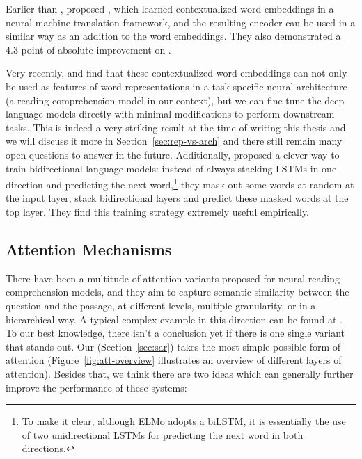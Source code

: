 Earlier than ,  proposed , which learned contextualized word embeddings in a neural machine translation framework, and the resulting encoder can be used in a similar way as an addition to the word embeddings. They also demonstrated a $4.3$ point of absolute improvement on .

Very recently,  and  find that these contextualized word embeddings can not only be used as features of word representations in a task-specific neural architecture (a reading comprehension model in our context), but we can fine-tune the deep language models directly with minimal modifications to perform downstream tasks. This is indeed a very striking result at the time of writing this thesis and we will discuss it more in Section~\ref{sec:rep-vs-arch} and there still remain many open questions to answer in the future. Additionally,  proposed a clever way to train bidirectional language models: instead of always stacking LSTMs in one direction and predicting the next word,\footnote{To make it clear, although ELMo adopts a biLSTM, it is essentially the use of two unidirectional LSTMs for predicting the next word in both directions.} they mask out some words at random at the input layer, stack bidirectional layers and predict these masked words at the top layer. They find this training strategy extremely useful empirically.

\subsection{Attention Mechanisms}
\label{sec:attention-mechanisms}

There have been a multitude of attention variants proposed for neural reading comprehension models, and they aim to capture semantic similarity between the question and the passage, at different levels, multiple granularity, or in a hierarchical way. A typical complex example in this direction can be found at \cite{huang2018fusionnet}. To our best knowledge, there isn't a conclusion yet if there is one single variant that stands out. Our  (Section~\ref{sec:sar}) takes the most simple possible form of attention (Figure~\ref{fig:att-overview} illustrates an overview of different layers of attention). Besides that, we think there are two ideas which can generally further improve the performance of these systems:

